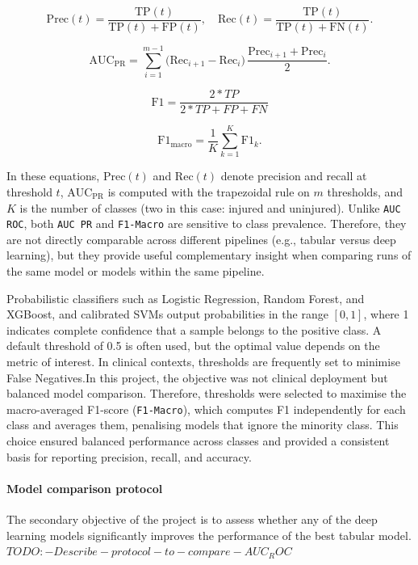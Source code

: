 \begin{equation}
    \mathrm{Prec}(t)=\frac{\mathrm{TP}(t)}{\mathrm{TP}(t)+\mathrm{FP}(t)},\quad
    \mathrm{Rec}(t)=\frac{\mathrm{TP}(t)}{\mathrm{TP}(t)+\mathrm{FN}(t)}.
\end{equation}

\begin{equation}
    \mathrm{AUC}_{\mathrm{PR}}
    = \sum_{i=1}^{m-1} \big(\mathrm{Rec}_{i+1}-\mathrm{Rec}_i\big)\,\frac{\mathrm{Prec}_{i+1}+\mathrm{Prec}_i}{2}.
\end{equation}

\begin{equation}
    \mathrm{F1}=\frac{2 * TP}{2 * TP + FP + FN}
\end{equation}

\begin{equation}
    \mathrm{F1}_{\mathrm{macro}}=\frac{1}{K}\sum_{k=1}^{K}\mathrm{F1}_k.
\end{equation}

In these equations, $\mathrm{Prec}(t)$ and $\mathrm{Rec}(t)$ denote precision and recall at threshold $t$, $\mathrm{AUC}_{\mathrm{PR}}$ is computed with the trapezoidal rule on $m$ thresholds, and $K$ is the number of classes (two in this case: injured and uninjured). Unlike \texttt{AUC ROC}, both \texttt{AUC PR} and \texttt{F1-Macro} are sensitive to class prevalence. Therefore, they are not directly comparable across different pipelines (e.g., tabular versus deep learning), but they provide useful complementary insight when comparing runs of the same model or models within the same pipeline.

Probabilistic classifiers such as Logistic Regression, Random Forest, and XGBoost, and calibrated SVMs output probabilities in the range $[0,1]$, where 1 indicates complete confidence that a sample belongs to the positive class. A default threshold of 0.5 is often used, but the optimal value depends on the metric of interest. In clinical contexts, thresholds are frequently set to minimise False Negatives.In this project, the objective was not clinical deployment but balanced model comparison. Therefore, thresholds were selected to maximise the macro-averaged F1-score (\texttt{F1-Macro}), which computes F1 independently for each class and averages them, penalising models that ignore the minority class. This choice ensured balanced performance across classes and provided a consistent basis for reporting precision, recall, and accuracy.


\paragraph{Model comparison protocol}
The secondary objective of the project is to assess whether any of the deep learning models significantly improves the performance of the best tabular model.
$TODO:-Describe-protocol-to-compare-AUC_ROC$
\citep{Sun2014}

